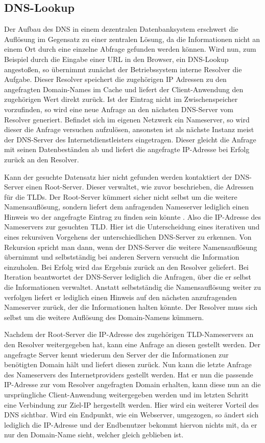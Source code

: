 \subsection{DNS-Lookup}
Der Aufbau des DNS in einem dezentralen Datenbanksystem erschwert die Auflösung im Gegensatz zu einer zentralen Lösung, da die Informationen nicht an einem Ort durch eine einzelne Abfrage gefunden werden können. Wird nun, zum Beispiel durch die Eingabe einer URL in den Browser, ein DNS-Lookup angestoßen, so übernimmt zunächst der Betriebssystem interne Resolver die Aufgabe. Dieser Resolver speichert die zugehörigen IP Adressen zu den angefragten Domain-Names im Cache und liefert der Client-Anwendung den zugehörigen Wert direkt zurück. Ist der Eintrag nicht im Zwischenspeicher vorzufinden, so wird eine neue Anfrage an den nächsten DNS-Server vom Resolver generiert. Befindet sich im eigenen Netzwerk ein Nameserver, so wird dieser die Anfrage versuchen aufzulösen, ansonsten ist als nächste Instanz meist der DNS-Server des Internetdienstleisters eingetragen. Dieser gleicht die Anfrage mit seinen Datenbeständen ab und liefert die angefragte IP-Adresse bei Erfolg zurück an den Resolver. \cite{1und1.22.01.2018}

Kann der gesuchte Datensatz hier nicht gefunden werden kontaktiert der DNS-Server einen Root-Server. Dieser verwaltet, wie zuvor beschrieben, die Adressen für die TLDs. Der Root-Server kümmert sicher nicht selbst um die weitere Namensauflösung, sondern liefert dem anfragenden Nameserver lediglich einen Hinweis wo der angefragte Eintrag zu finden sein könnte \cite{Schreiner.2016}. Also die IP-Adresse des Nameservers zur gesuchten TLD. Hier ist die Unterscheidung eines iterativen und eines rekursiven Vorgehens der unterschiedlichen DNS-Server zu erkennen. Von Rekursion spricht man dann, wenn der DNS-Server die weitere Namensauflösung übernimmt und selbstständig bei anderen Servern versucht die Information einzuholen. Bei Erfolg wird das Ergebnis zurück an den Resolver geliefert. Bei Iteration beantwortet der DNS-Server lediglich die Anfragen, über die er selbst die Informationen verwaltet. Anstatt selbstständig die Namensauflösung weiter zu verfolgen liefert er lediglich einen Hinweis auf den nächsten anzufragenden Nameserver zurück, der die Informationen halten könnte. Der Resolver muss sich selbst um die weitere Auflösung des Domain-Namens kümmern. \cite{1und1.22.01.2018}

Nachdem der Root-Server die IP-Adresse des zugehörigen TLD-Nameservers an den Resolver weitergegeben hat, kann eine Anfrage an diesen gestellt werden. Der angefragte Server kennt wiederum den Server der die Informationen zur benötigten Domain hält und liefert diesen zurück. Nun kann die letzte Anfrage des Nameservers des Internetproviders gestellt werden. Hat er nun die passende IP-Adresse zur vom Resolver angefragten Domain erhalten, kann diese nun an die ursprüngliche Client-Anwendung weitergegeben werden und im letzten Schritt eine Verbindung zur Ziel-IP hergestellt werden. Hier wird ein weiterer Vorteil des DNS sichtbar. Wird ein Endpunkt, wie ein Webserver, umgezogen, so ändert sich lediglich die IP-Adresse und der Endbenutzer bekommt hiervon nichts mit, da er nur den Domain-Name sieht, welcher gleich geblieben ist. \cite{Schreiner.2016}

